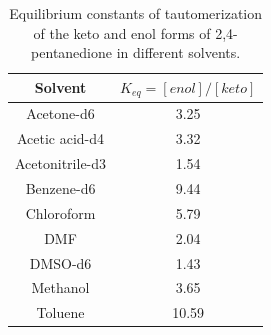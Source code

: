 \documentclass[8.5pt,twoside,twocolumn]{article}
\begin{document}
\begin{table}[h]
  \small
  \center
  \caption{Equilibrium constants of tautomerization of the keto and enol forms of 2,4-pentanedione in different solvents.}
  \label{table:keqs}
  \begin{tabular*}{0.3\textwidth}{@{\extracolsep{\fill}}cc}
    \hline
    Solvent & $K_{eq} = [enol]/[keto]$ \\
    \hline
    Acetone-d6      & 3.25\\
    Acetic acid-d4  & 3.32\\
    Acetonitrile-d3 & 1.54\\
    Benzene-d6      & 9.44\\
    Chloroform      & 5.79\\
    DMF             & 2.04\\
    DMSO-d6         & 1.43\\
    Methanol        & 3.65\\
    Toluene         & 10.59\\
    \hline
  \end{tabular*}
\end{table}
\end{document}
